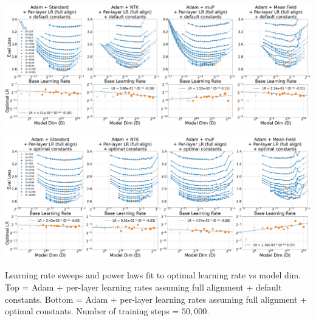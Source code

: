 \documentclass{article}
\theoremstyle{plain}
\theoremstyle{definition}
\theoremstyle{remark}
\begin{document}
\thispagestyle{plain}
\begin{SidewaysFigure}
\includegraphics[width=\linewidth]{icml2024/figures/lr_sweeps/appendix/adam/adam+50k_steps_per_module_lr.pdf}

\figvspace

\includegraphics[width=\linewidth]{icml2024/figures/lr_sweeps/appendix/adam/adam+50k_steps_per_module_lr_optimal_constants.pdf}
\caption{Learning rate sweeps and power laws fit to optimal learning rate vs model dim. Top = Adam + per-layer learning rates assuming full alignment + default constants. Bottom = Adam + per-layer learning rates assuming full alignment + optimal constants. Number of training steps = $50{,}000$.}
\end{SidewaysFigure}
\clearpage
\end{document}
